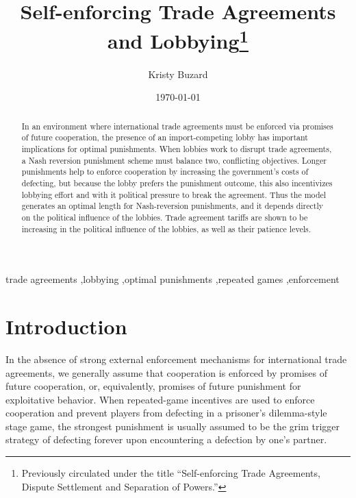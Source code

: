 \documentclass[authoryear, review]{elsarticle}
\begin{document}
\title{Self-enforcing Trade Agreements and Lobbying\footnote{Previously circulated under the title ``Self-enforcing Trade Agreements, Dispute Settlement and Separation of Powers.''}}
\author{Kristy Buzard}
\address{110 Eggers Hall, Economics Department, Syracuse University, Syracuse, NY 13244. 315-443-4079.}
\date{\today}

\begin{abstract}
In an environment where international trade agreements must be enforced via promises of future cooperation, the presence of an import-competing lobby has important implications for optimal punishments. When lobbies work to disrupt trade agreements, a Nash reversion punishment scheme must balance two, conflicting objectives. Longer punishments help to enforce cooperation by increasing the government's costs of defecting, but because the lobby prefers the punishment outcome, this also incentivizes lobbying effort and with it political pressure to break the agreement. Thus the model generates an optimal length for Nash-reversion punishments, and it depends directly on the political influence of the lobbies. Trade agreement tariffs are shown to be increasing in the political influence of the lobbies, as well as their patience levels.
\end{abstract}

\begin{keyword}

trade agreements \sep lobbying \sep optimal punishments \sep repeated games \sep enforcement

\end{keyword}

\maketitle

\section{Introduction}
\label{sec:intro}
In the absence of strong external enforcement mechanisms for international trade agreements, we generally assume that cooperation is enforced by promises of future cooperation, or, equivalently, promises of future punishment for exploitative behavior. When repeated-game incentives are used to enforce cooperation and prevent players from defecting in a prisoner's dilemma-style stage game, the strongest punishment is usually assumed to be the grim trigger strategy of defecting forever upon encountering a defection by one's partner.
\end{document}
